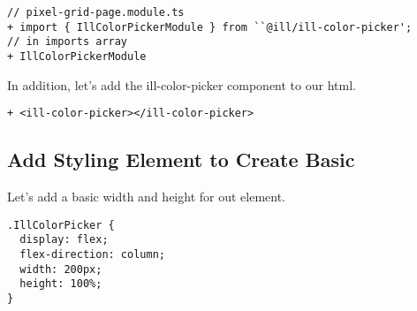 \begin{lstlisting}
// pixel-grid-page.module.ts
+ import { IllColorPickerModule } from ``@ill/ill-color-picker';
// in imports array
+ IllColorPickerModule
\end{lstlisting}

In addition, let's add the ill-color-picker component to our html.
\begin{lstlisting}
+ <ill-color-picker></ill-color-picker>
\end{lstlisting}

\subsection{ Add Styling Element to Create Basic  }
Let's add a basic width and height for out element.
\begin{lstlisting}
.IllColorPicker {
  display: flex;
  flex-direction: column;
  width: 200px;
  height: 100%;
}
\end{lstlisting}
